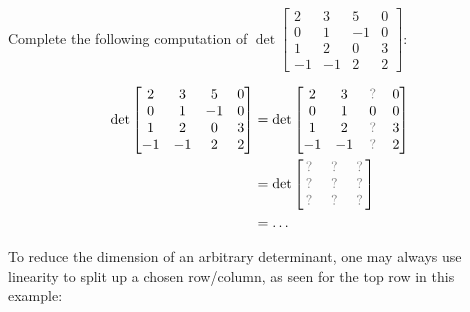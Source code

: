 \begin{applicationActivities}{2}{26}
\begin{activity}{15}
  Complete the following computation of
  $\det \begin{bmatrix} 2 & 3 & 5 & 0 \\ 0 & 1 & -1 & 0 \\ 1 & 2 & 0 & 3 \\ -1 & -1 & 2 & 2 \end{bmatrix}$:

  \begin{align*}
    \det \begin{bmatrix} 2 & 3 & 5 & 0 \\ 0 & 1 & -1 & 0 \\ 1 & 2 & 0 & 3 \\ -1 & -1 & 2 & 2 \end{bmatrix}
  &=
    \det \begin{bmatrix} 2 & 3 & \unknown & 0 \\ 0 & 1 & 0 & 0 \\ 1 & 2 & \unknown & 3 \\ -1 & -1 & \unknown & 2 \end{bmatrix}
  \\ &=
    \det \begin{bmatrix} \unknown & \unknown & \unknown \\\unknown & \unknown & \unknown \\\unknown & \unknown & \unknown  \end{bmatrix}
  \\ &=
    \dots
  \end{align*}
\end{activity}

\begin{observation}
  To reduce the dimension of an arbitrary determinant, one may always use
  linearity to split up a chosen row/column, as seen for the top row in
  this example:


\end{observation}
\end{applicationActivities}

